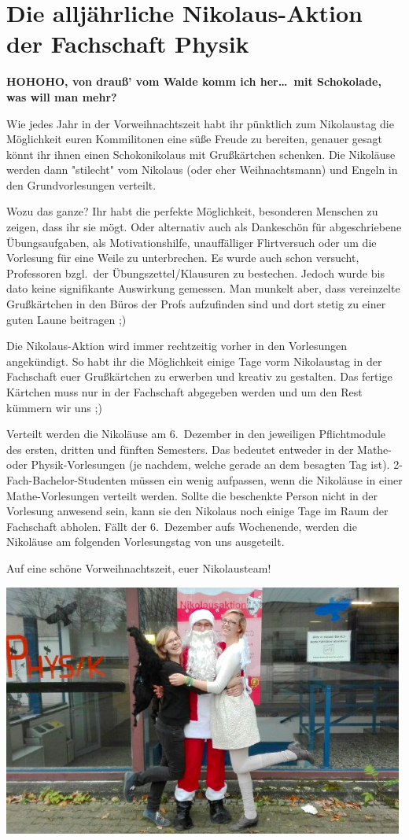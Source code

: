 \section{Die alljährliche Nikolaus-Aktion der Fachschaft Physik}
\begin{multicols}{2}
\textbf{HOHOHO, von drauß' vom Walde komm ich her\dots\
	mit Schokolade, was will man mehr?}

Wie jedes Jahr in der Vorweihnachtszeit habt ihr pünktlich zum Nikolaustag die Möglichkeit euren Kommilitonen eine süße Freude zu bereiten, genauer gesagt könnt ihr ihnen einen Schokonikolaus mit Grußkärtchen schenken. 
Die Nikoläuse werden dann "stilecht"  vom Nikolaus (oder eher Weihnachtsmann) und Engeln in den Grundvorlesungen verteilt.

Wozu das ganze? Ihr habt die perfekte Möglichkeit, besonderen Menschen zu zeigen, dass ihr sie mögt. Oder alternativ auch als Dankeschön für abgeschriebene Übungsaufgaben, als Motivationshilfe, 
unauffälliger Flirtversuch oder um die Vorlesung für eine Weile zu unterbrechen. Es wurde auch schon versucht, Professoren bzgl.\ der Übungszettel/Klausuren zu bestechen. 
Jedoch wurde bis dato keine signifikante Auswirkung gemessen. Man munkelt aber, dass vereinzelte Grußkärtchen in den Büros der Profs aufzufinden sind und dort stetig zu einer guten Laune beitragen ;)

Die Nikolaus-Aktion wird immer rechtzeitig vorher in den Vorlesungen angekündigt. So habt ihr die Möglichkeit einige Tage vorm Nikolaustag in der Fachschaft euer Grußkärtchen zu erwerben und kreativ zu gestalten. 
Das fertige Kärtchen muss nur in der Fachschaft abgegeben werden und um den Rest kümmern wir uns ;)

Verteilt werden die Nikoläuse am 6.~Dezember in den jeweiligen Pflichtmodule des ersten, dritten und fünften Semesters. Das bedeutet entweder in der Mathe- oder Physik-Vorlesungen (je nachdem, welche gerade an dem besagten Tag ist).
2-Fach-Bachelor-Studenten müssen ein wenig aufpassen, wenn die Nikoläuse in einer Mathe-Vorlesungen verteilt werden.
Sollte die beschenkte Person nicht in der Vorlesung anwesend sein, kann sie den Nikolaus noch einige Tage im Raum der Fachschaft abholen.
Fällt der 6.~Dezember aufs Wochenende, werden die Nikoläuse am folgenden Vorlesungstag von uns ausgeteilt.

Auf eine schöne Vorweihnachtszeit, euer Nikolausteam!

\end{multicols}

\vspace{\fill}
\begin{center}
	\includegraphics[width=0.99\textwidth]{res/nikolaus.jpg}
\end{center}
